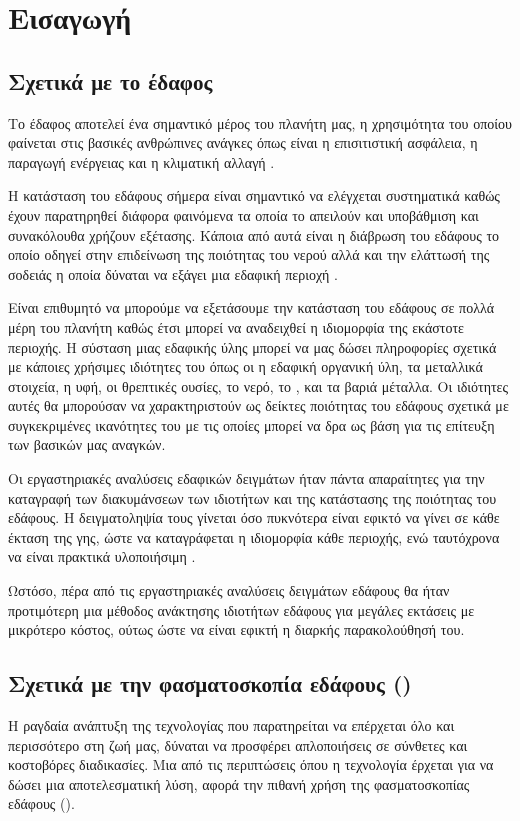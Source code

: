 \chapter{Εισαγωγή}
\label{ch:introduction}

\section{Σχετικά με το έδαφος}
Το έδαφος αποτελεί ένα σημαντικό μέρος του πλανήτη μας, η χρησιμότητα του οποίου φαίνεται στις βασικές ανθρώπινες ανάγκες όπως είναι η επισιτιστική ασφάλεια, η παραγωγή ενέργειας και η κλιματική αλλαγή \cite{vis_near_spectr}.

Η κατάσταση του εδάφους σήμερα είναι σημαντικό να ελέγχεται συστηματικά καθώς έχουν παρατηρηθεί διάφορα φαινόμενα τα οποία το απειλούν και υποβάθμιση και συνακόλουθα χρήζουν εξέτασης. Κάποια από αυτά είναι η διάβρωση του εδάφους το οποίο οδηγεί στην επιδείνωση της ποιότητας του νερού αλλά και την ελάττωσή της σοδειάς η οποία δύναται να εξάγει μια εδαφική περιοχή \cite{world_soil_under_threat}.

Είναι επιθυμητό να μπορούμε να εξετάσουμε την κατάσταση του εδάφους σε πολλά μέρη του πλανήτη καθώς έτσι μπορεί να αναδειχθεί η ιδιομορφία της εκάστοτε περιοχής. Η σύσταση μιας εδαφικής ύλης μπορεί να μας δώσει πληροφορίες σχετικά με κάποιες χρήσιμες ιδιότητες του όπως οι η εδαφική οργανική ύλη, τα μεταλλικά στοιχεία, η υφή, οι θρεπτικές ουσίες, το νερό, το , και τα βαριά μέταλλα. Οι ιδιότητες αυτές θα μπορούσαν να χαρακτηριστούν ως δείκτες ποιότητας του εδάφους σχετικά με συγκεκριμένες ικανότητες του με τις οποίες μπορεί να δρα ως βάση για τις επίτευξη των βασικών μας αναγκών.

Οι εργαστηριακές αναλύσεις εδαφικών δειγμάτων ήταν πάντα απαραίτητες για την καταγραφή των διακυμάνσεων των ιδιοτήτων και της κατάστασης της ποιότητας του εδάφους. Η δειγματοληψία τους γίνεται όσο πυκνότερα είναι εφικτό να γίνει σε κάθε έκταση της γης, ώστε να καταγράφεται η ιδιομορφία κάθε περιοχής, ενώ ταυτόχρονα να είναι πρακτικά υλοποιήσιμη \cite{soil_spectr}.

Ωστόσο, πέρα από τις εργαστηριακές αναλύσεις δειγμάτων εδάφους θα ήταν προτιμότερη μια μέθοδος ανάκτησης ιδιοτήτων εδάφους για μεγάλες εκτάσεις με μικρότερο κόστος, ούτως ώστε να είναι εφικτή η διαρκής παρακολούθησή του.

\section{Σχετικά με την φασματοσκοπία εδάφους ()}
Η ραγδαία ανάπτυξη της τεχνολογίας που παρατηρείται να επέρχεται όλο και περισσότερο στη ζωή μας, δύναται να προσφέρει απλοποιήσεις σε σύνθετες και κοστοβόρες διαδικασίες. Μια από τις περιπτώσεις όπου η τεχνολογία έρχεται για να δώσει μια αποτελεσματική λύση, αφορά την πιθανή χρήση της φασματοσκοπίας εδάφους ().

